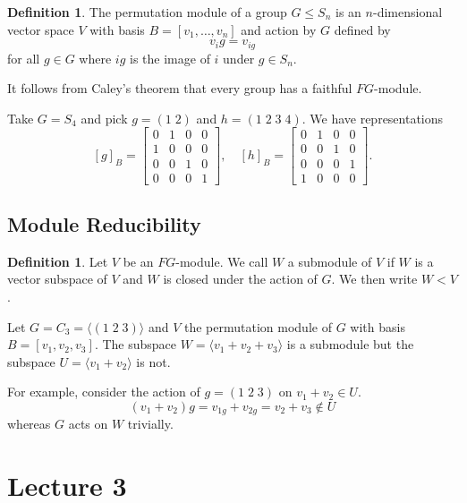 \documentclass[11pt, notitlepage]{article}
\numberwithin{equation}{section}
\theoremstyle{plain}
\theoremstyle{definition}
\newtheorem{definition}[theorem]{Definition}
\newenvironment{example}
	{\pushQED{\qed}\renewcommand{\qedsymbol}{$\blacktriangleleft$}\examplex}
	{\popQED\endexamplex}
\begin{document}
\begin{definition}
	The permutation module of a group $G \leq S_n$ is an $n$-dimensional vector space $V$ with basis $B = [v_1, \ldots, v_n]$ and action by $G$ defined by
\[
	v_i g = v_{ig}
\]
for all $g \in G$ where $ig$ is the image of $i$ under $g \in S_n$.
\end{definition}


It follows from Caley's theorem that every group has a faithful $FG$-module.

\begin{example}
Take $G = S_4$ and pick $g = (1\;2)$ and $h = (1\;2\;3\;4)$. We have representations
\[
[g]_B = \begin{bmatrix} 0&1&0&0\\ 1&0&0&0\\ 0&0&1&0\\ 0&0&0&1 \end{bmatrix}, \quad
[h]_B = \begin{bmatrix} 0&1&0&0\\ 0&0&1&0\\ 0&0&0&1\\ 1&0&0&0 \end{bmatrix}.
\]
\end{example}


\subsection{Module Reducibility}



\begin{definition}
Let $V$ be an $FG$-module. We call $W$ a submodule of $V$ if $W$ is a vector subspace of $V$ and $W$ is closed under the action of $G$. We then write $W<V$.
\end{definition}

\begin{example}
Let $G=C_3=\langle (1\;2\;3)\rangle$ and $V$ the permutation module of $G$ with basis $B=[v_1,v_2,v_3]$. The subspace $W=\langle v_1 + v_2 + v_3 \rangle$ is a submodule but the subspace $U=\langle v_1 + v_2 \rangle$ is not.

For example, consider the action of $g = (1\;2\;3)$ on $v_1 + v_2 \in U$. 
\[
	(v_1 + v_2)g = v_{1g} + v_{2g} = v_2 + v_3 \not\in U
\]
whereas $G$ acts on $W$ trivially.
\end{example}
\section{Lecture 3}
\end{document}
